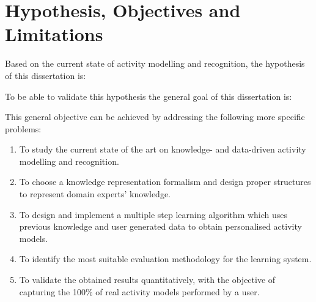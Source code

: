\section{Hypothesis, Objectives and Limitations}
\label{sec:intro:hypothesis}


Based on the current state of activity modelling and recognition, the hypothesis of this dissertation is:

\vspace{0.5cm}

\noindent{}

\vspace{0.5cm}

To be able to validate this hypothesis the general goal of this dissertation is:

\vspace{0.5cm}

\noindent{}

\vspace{0.5cm}



This general objective can be achieved by addressing the following more specific problems:

\begin{enumerate}
 \item To study the current state of the art on knowledge- and data-driven activity modelling and recognition.
 \item To choose a knowledge representation formalism and design proper structures to represent domain experts' knowledge.
 \item To design and implement a multiple step learning algorithm which uses previous knowledge and user generated data to obtain personalised activity models.
 \item To identify the most suitable evaluation methodology for the learning system.
 \item To validate the obtained results quantitatively, with the objective of capturing the 100\% of real activity models performed by a user. 
\end{enumerate}

